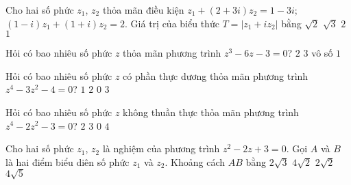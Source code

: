 \begin{ex}%
Cho hai số phức $z_1$, $z_2$ thỏa mãn điều kiện $z_1+(2+3i)z_2=1-3i$; $(1-i)z_1+(1+i)z_2=2$. Giá trị của biểu thức $T=\left|z_1+iz_2\right|$ bằng
\choice
{$\sqrt{2}$}
{$\sqrt{3}$}
{\True $2$}
{$1$}
\end{ex}

\begin{ex}%
Hỏi có bao nhiêu số phức $z$ thỏa mãn phương trình $z^3-6z-3=0$?
\choice
{$2$}
{\True $3$}
{vô số}
{$1$}
\end{ex}

\begin{ex}%
Hỏi có bao nhiêu số phức $z$ có phần thực dương thỏa mãn phương trình \linebreak $z^4-3z^2-4=0$?
\choice
{\True $1$}
{$2$}
{$0$}
{$3$}
\end{ex}

\begin{ex}%
Hỏi có bao nhiêu số phức $z$ không thuần thực thỏa mãn phương trình \linebreak $z^4-2z^2-3=0$?
\choice
{\True $2$}
{$3$}
{$0$}
{$4$}
\end{ex}

\begin{ex}%
Cho hai số phức $z_1$, $z_2$ là nghiệm của phương trình $z^2-2z+3=0$. Gọi $A$ và $B$ là hai điểm biểu diên số phức $z_1$ và $z_2$. Khoảng cách $AB$ bằng
\choice
{$2\sqrt{3}$}
{$4\sqrt{2}$}
{\True $2\sqrt{2}$}
{$4\sqrt{5}$}
\end{ex}

